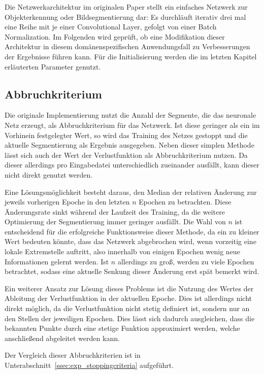 Die Netzwerkarchitektur im originalen Paper stellt ein einfaches Netzwerk zur Objekterkennung oder Bildsegmentierung dar: Es durchläuft iterativ drei mal eine Reihe mit je einer Convolutional Layer, gefolgt von einer Batch Normalization. Im Folgenden wird geprüft, ob eine Modifikation dieser Architektur in diesem domänenspezifischen Anwendungsfall zu Verbesserungen der Ergebnisse führen kann. Für die Initialisierung werden die im letzten Kapitel erläuterten Parameter genutzt.

\subsection{Abbruchkriterium}
\label{ssec:stoppingcriteria}

Die originale Implementierung nutzt die Anzahl der Segmente, die das neuronale Netz erzeugt, als Abbruchkriterium für das Netzwerk. Ist diese geringer als ein im Vorhinein festgelegter Wert, so wird das Training des Netzes gestoppt und die aktuelle Segmentierung als Ergebnis ausgegeben. Neben dieser simplen Methode lässt sich auch der Wert der Verlustfunktion als Abbruchkriterium nutzen. Da dieser allerdings pro Eingabedatei unterschiedlich zueinander ausfällt, kann dieser nicht direkt genutzt werden.

Eine Lösungsmöglichkeit besteht daraus, den Median der relativen Änderung zur jeweils vorherigen Epoche in den letzten $n$ Epochen zu betrachten. Diese Änderungsrate sinkt während der Laufzeit des Training, da die weitere Optimierung der Segmentierung immer geringer ausfällt. Die Wahl von $n$ ist entscheidend für die erfolgreiche Funktionsweise dieser Methode, da ein zu kleiner Wert bedeuten könnte, dass das Netzwerk abgebrochen wird, wenn vorzeitig eine lokale Extremstelle auftritt, also \zB innerhalb von einigen Epochen wenig neue Informationen gelernt werden. Ist $n$ allerdings zu groß, werden zu viele Epochen betrachtet, sodass eine aktuelle Senkung dieser Änderung erst spät bemerkt wird.

Ein weiterer Ansatz zur Lösung dieses Problems ist die Nutzung des Wertes der Ableitung der Verlustfunktion in der aktuellen Epoche. Dies ist allerdings nicht direkt möglich, da die Verlustfunktion nicht stetig definiert ist, sondern nur an den Stellen der jeweiligen Epochen. Dies lässt sich dadurch ausgleichen, dass die bekannten Punkte durch eine stetige Funktion approximiert werden, welche anschließend abgeleitet werden kann.

Der Vergleich dieser Abbruchkriterien ist in Unterabschnitt~\ref{ssec:exp_stoppingcriteria} aufgeführt.

